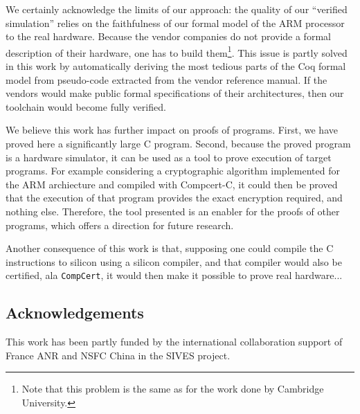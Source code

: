\documentclass{llncs}
\newcommand{\compcert}{\texttt{CompCert}\xspace}
\begin{document}
We certainly acknowledge the limits of our approach: the quality of
our ``verified simulation'' relies on the faithfulness of our formal
model of the ARM processor to the real hardware. Because the vendor
companies do not provide a formal description of their hardware, one
has to build them\footnote{Note that this problem is the same as for
  the work done by Cambridge University.}.  This issue is partly
solved in this work by automatically deriving the most tedious parts
of the Coq formal model from pseudo-code extracted from the vendor
reference manual.  If the vendors would make public formal
specifications of their architectures, then our toolchain would become
fully verified.

We believe this work has further impact on proofs of programs.  First,
we have proved here a significantly large C program.  Second, because
the proved program is a hardware simulator, it can be used as a tool
to prove execution of target programs.  For example considering a
cryptographic algorithm implemented for the ARM archiecture and
compiled with Compcert-C, it could then be proved that the execution
of that program provides the exact encryption required, and nothing
else.  Therefore, the tool presented is an enabler for the proofs of
other programs, which offers a direction for future research.

Another consequence of this work is that, supposing one could
compile the C instructions to silicon using a silicon compiler,
and that compiler would also be certified, ala \compcert,
it would then make it possible to prove real hardware...


\subsection{Acknowledgements}
This work has been partly funded by the international collaboration support
of France ANR and NSFC China in the SIVES project.




% 
% 
% 
\end{document}
